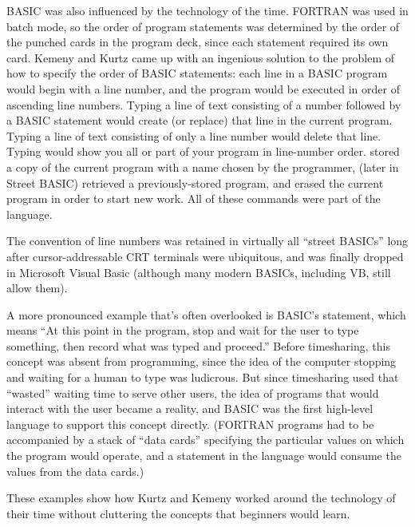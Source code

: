 

BASIC was also influenced by the technology of the time.  
FORTRAN was used in batch mode, so the order of program statements was
determined by the order of the punched cards in the program deck, since
each statement required its own card.
Kemeny and Kurtz came up with an ingenious solution to the problem of
how to specify the order of BASIC statements: each line in a BASIC
program would begin with a line number, and the program would be
executed in order of ascending line numbers.
Typing a line of text consisting of a number followed by a BASIC statement
would create (or replace) that line in the current program.
Typing a line of text consisting of only a line number would delete that line.
Typing  would show
you all or part of your program in line-number order.
 stored a copy of the current program with a name
chosen by the programmer,  (later  in Street BASIC)
retrieved a previously-stored program, and  erased the current
program in order to start new work.  All of these commands were part
of the language.

  \begin{geeknote}
  The convention of line numbers was retained in virtually all ``street
  BASICs'' long after cursor-addressable CRT terminals were ubiquitous,
  and was finally dropped in Microsoft Visual Basic (although many modern
  BASICs, including VB, still allow them).
  \end{geeknote}

A more pronounced example that's often overlooked is BASIC's 
statement, which means ``At this point in the program, stop and wait for
the user to type something, then record what was typed and proceed.''
Before timesharing, this concept was absent from programming, since the
idea of the computer stopping and waiting for a human to type was
ludicrous.  But since timesharing used that ``wasted'' waiting time to
serve other users, the idea of programs that would interact with the
user became a reality, and BASIC was the first high-level language to
support this concept directly.  (FORTRAN programs had to be accompanied
by a stack of ``data cards'' specifying the particular values on which
the program would operate, and a  statement in the language
would consume the values from the data cards.)

These examples show how Kurtz and Kemeny worked around the technology of their
time without cluttering the concepts that beginners would learn.



